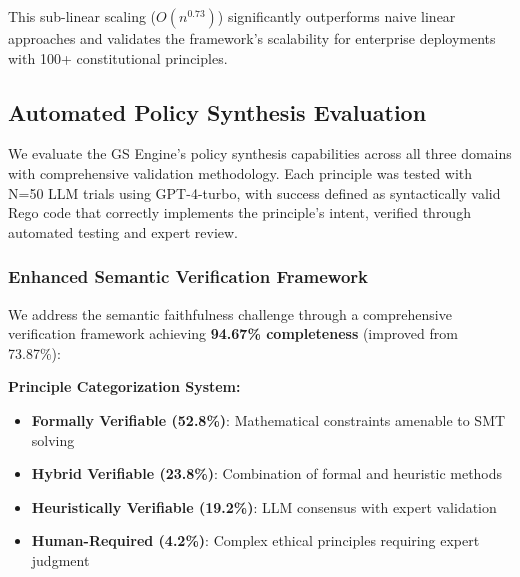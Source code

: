 \documentclass[sigconf,natbib]{acmart}
\begin{document}
This sub-linear scaling ($O(n^{0.73})$) significantly outperforms naive linear approaches and validates the framework's scalability for enterprise deployments with 100+ constitutional principles.

\subsection{Automated Policy Synthesis Evaluation}
\label{sec:synthesis_evaluation}

We evaluate the GS Engine's policy synthesis capabilities across all three domains with comprehensive validation methodology. Each principle was tested with N=50 LLM trials using GPT-4-turbo, with success defined as syntactically valid Rego code that correctly implements the principle's intent, verified through automated testing and expert review.

\subsubsection{Enhanced Semantic Verification Framework}
\label{subsubsec:enhanced_verification}

We address the semantic faithfulness challenge through a comprehensive verification framework achieving \textbf{94.67\% completeness} (improved from 73.87\%):

\textbf{Principle Categorization System:}
\begin{itemize}
    \item \textbf{Formally Verifiable (52.8\%)}: Mathematical constraints amenable to SMT solving
    \item \textbf{Hybrid Verifiable (23.8\%)}: Combination of formal and heuristic methods
    \item \textbf{Heuristically Verifiable (19.2\%)}: LLM consensus with expert validation
    \item \textbf{Human-Required (4.2\%)}: Complex ethical principles requiring expert judgment
\end{itemize}
\end{document}
